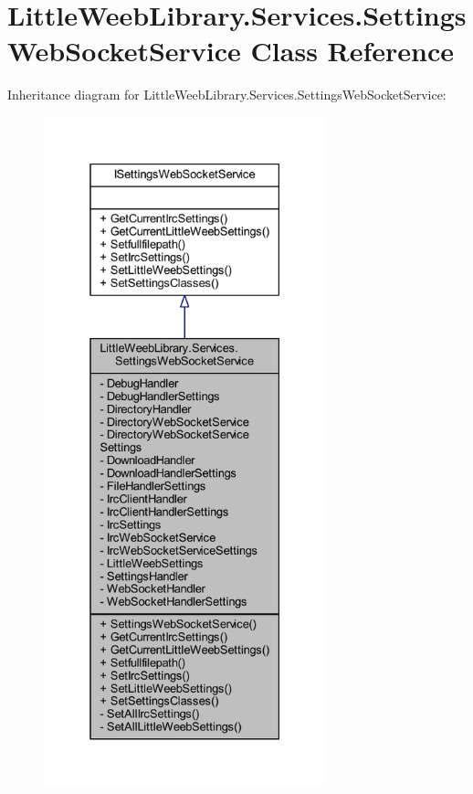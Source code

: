 \hypertarget{class_little_weeb_library_1_1_services_1_1_settings_web_socket_service}{}\section{Little\+Weeb\+Library.\+Services.\+Settings\+Web\+Socket\+Service Class Reference}
\label{class_little_weeb_library_1_1_services_1_1_settings_web_socket_service}


Inheritance diagram for Little\+Weeb\+Library.\+Services.\+Settings\+Web\+Socket\+Service\+:\nopagebreak
\begin{figure}[H]
\begin{center}
\leavevmode
\includegraphics[height=550pt]{class_little_weeb_library_1_1_services_1_1_settings_web_socket_service__inherit__graph}
\end{center}
\end{figure}


